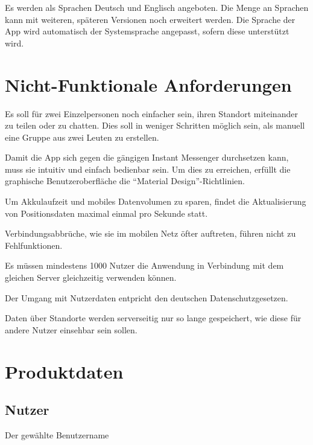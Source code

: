\documentclass[parskip=full,11pt]{scrartcl}
\begin{document}
Es werden als Sprachen Deutsch und Englisch angeboten.
Die Menge an Sprachen kann mit weiteren, späteren Versionen noch erweitert
werden.
Die Sprache der App wird automatisch der Systemsprache angepasst, sofern diese
unterstützt wird.

\pagebreak
\section{Nicht-Funktionale Anforderungen}

%
Es soll für zwei Einzelpersonen noch einfacher sein, ihren Standort miteinander
zu teilen oder zu chatten. Dies soll in weniger Schritten möglich sein, als
manuell eine Gruppe aus zwei Leuten zu erstellen.

Damit die App sich gegen die gängigen Instant Messenger durchsetzen kann, muss
sie intuitiv und einfach bedienbar sein. Um dies zu erreichen, erfüllt die
graphische Benutzeroberfläche die \enquote{Material Design}-Richtlinien.

Um Akkulaufzeit und mobiles Datenvolumen zu sparen, findet die Aktualisierung
von Positionsdaten maximal einmal pro Sekunde statt.

Verbindungsabbrüche, wie sie im mobilen Netz öfter auftreten, führen nicht zu
Fehlfunktionen.

Es müssen mindestens 1000 Nutzer die Anwendung in Verbindung mit dem gleichen
Server gleichzeitig verwenden können.

%
Der Umgang mit Nutzerdaten entpricht den deutschen Datenschutzgesetzen.

Daten über Standorte werden serverseitig nur so lange gespeichert, wie diese
für andere Nutzer einsehbar sein sollen.

\pagebreak
\section{Produktdaten}
\subsection{Nutzer}
Der gewählte Benutzername
\end{document}

